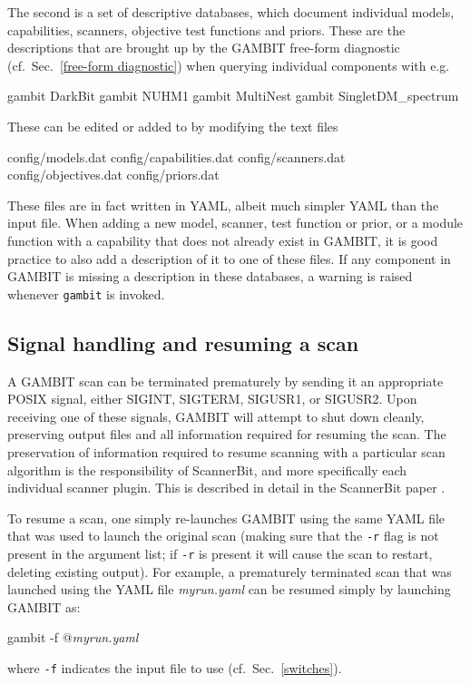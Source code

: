 \documentclass[pdftex,twocolumn,epjc3_preprint,runningheads]{svjour3}
\renewcommand{\_}{\discretionary{\underscore}{}{\underscore}}
\newcommand\term[1]{{\lstset{style=terminal}\lstinline!#1!\lstset{style=cpp}}}
\newcommand{\metavarf}[1]{\textit{\color{darkgreen}\footnotesize\textrm{#1}}}
\newcommand{\metavar}{\metavarf}
\newcommand{\gambit}{\textsf{GAMBIT}\xspace}
\newcommand{\scannerbit}{\textsf{ScannerBit}\xspace}
\newcommand{\GB}{\gambit}
\newcommand{\posix}{\textsf{POSIX}\xspace}
\newcommand\YAML{\textsf{YAML}\xspace}
\begin{document}
The second is a set of descriptive databases, which document individual models, capabilities, scanners, objective test functions and priors.  These are the descriptions that are brought up by the \GB free-form diagnostic (cf.\ Sec.\ \ref{free-form diagnostic}) when querying individual components with e.g.
\begin{lstterm}
gambit DarkBit
gambit NUHM1
gambit MultiNest
gambit SingletDM_spectrum
\end{lstterm}
These can be edited or added to by modifying the text files
\begin{lstterm}
config/models.dat
config/capabilities.dat
config/scanners.dat
config/objectives.dat
config/priors.dat
\end{lstterm}
These files are in fact written in \YAML, albeit much simpler \YAML than the input file.  When adding a new model, scanner, test function or prior, or a module function with a capability that does not already exist in \GB, it is good practice to also add a description of it to one of these files.  If any component in \GB is missing a description in these databases, a warning is raised whenever \term{gambit} is invoked.

\subsection{Signal handling and resuming a scan}
\label{resume}

A \GB scan can be terminated prematurely by sending it an appropriate \posix signal, either SIGINT, SIGTERM, SIGUSR1, or SIGUSR2. Upon receiving one of these signals, \GB will attempt to shut down cleanly, preserving output files and all information required for resuming the scan. The preservation of information required to resume scanning with a particular scan algorithm is the responsibility of \scannerbit, and more specifically each individual scanner plugin. This is described in detail in the \scannerbit paper \cite{ScannerBit}.

To resume a scan, one simply re-launches \GB using the same \YAML file that was used to launch the original scan (making sure that the \term{-r} flag is not present in the argument list; if \term{-r} is present it will cause the scan to restart, deleting existing output). For example, a prematurely terminated scan that was launched using the \YAML file \metavar{myrun.yaml} can be resumed simply by launching \GB as:
\begin{lstterm}
gambit -f @\metavar{myrun.yaml}
\end{lstterm}
where \term{-f} indicates the input file to use (cf.\ Sec.\ \ref{switches}).
\end{document}
